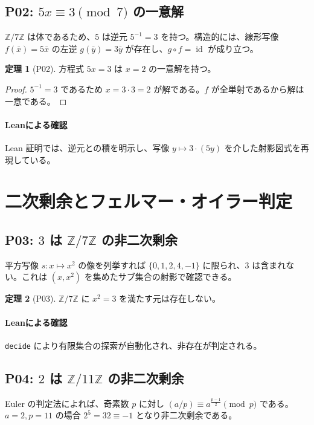 \documentclass{ltjsarticle}
\theoremstyle{definition}
\newtheorem{theorem}{定理}[section]
\begin{document}
\subsection{P02: $5x \equiv 3 \pmod 7$ の一意解}
$\mathbb{Z}/7\mathbb{Z}$ は体であるため、$5$ は逆元 $5^{-1}=3$ を持つ。構造的には、線形写像 $f(\bar x)=5\bar x$ の左逆 $g(\bar y)=3\bar y$ が存在し、$g\circ f = \operatorname{id}$ が成り立つ。

\begin{theorem}[P02]
方程式 $5x=3$ は $x=2$ の一意解を持つ。
\end{theorem}

\begin{proof}
$5^{-1}=3$ であるため $x = 3\cdot 3 = 2$ が解である。$f$ が全単射であるから解は一意である。
\end{proof}

\paragraph{Leanによる確認} Lean 証明では、逆元との積を明示し、写像 $y \mapsto 3\cdot(5y)$ を介した射影図式を再現している。

\section{二次剰余とフェルマー・オイラー判定}
\subsection{P03: $3$ は $\mathbb{Z}/7\mathbb{Z}$ の非二次剰余}
平方写像 $s: x \mapsto x^2$ の像を列挙すれば $\{0,1,2,4,-1\}$ に限られ、$3$ は含まれない。これは $(x,x^2)$ を集めたサブ集合の射影で確認できる。

\begin{theorem}[P03]
$\mathbb{Z}/7\mathbb{Z}$ に $x^2=3$ を満たす元は存在しない。
\end{theorem}

\paragraph{Leanによる確認} \verb|decide| により有限集合の探索が自動化され、非存在が判定される。

\subsection{P04: $2$ は $\mathbb{Z}/11\mathbb{Z}$ の非二次剰余}
Euler の判定法によれば、奇素数 $p$ に対し $(a/p) \equiv a^{\frac{p-1}{2}} \pmod p$ である。$a=2, p=11$ の場合 $2^5 = 32 \equiv -1$ となり非二次剰余である。
\end{document}
